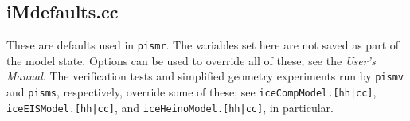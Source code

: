 \documentclass[12pt,final]{amsart}%
\theoremstyle{plain}
\theoremstyle{definition}
\theoremstyle{remark}
\begin{document}
\subsection*{iMdefaults.cc}  These are defaults used in \texttt{pismr}.  The variables set here are not saved as part of the model state.  Options can be used to override all of these; see the \emph{User's Manual}.  The verification tests and simplified geometry experiments run by \texttt{pismv} and \texttt{pisms}, respectively, override some of these; see \texttt{iceCompModel.[hh|cc]}, \texttt{iceEISModel.[hh|cc]}, and \texttt{iceHeinoModel.[hh|cc]}, in particular.

\scriptsize
\begin{quote}

\end{quote}
\normalsize

\newpage


\end{document}
